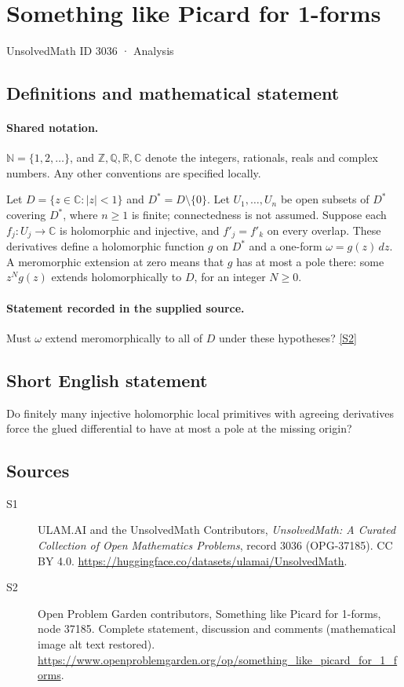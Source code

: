 \documentclass[11pt]{book}
\newcommand{\sref}[2]{\hyperlink{source:#1:#2}{[S#2]}}
\begin{document}
\setcounter{section}{3035}
\section{Something like Picard for 1-forms}\label{3036}
{\small\sffamily UnsolvedMath ID 3036 · Analysis}
\subsection{Definitions and mathematical statement}

\paragraph{Shared notation.}$\mathbb N=\{1,2,\ldots\}$, and $\mathbb Z,\mathbb Q,\mathbb R,\mathbb C$ denote the integers, rationals, reals and complex numbers. Any other conventions are specified locally.


Let $D=\{z\in\mathbb C:|z|<1\}$ and $D^*=D\setminus\{0\}$. Let $U_1,\ldots,U_n$ be open subsets of $D^*$ covering $D^*$, where $n\geq1$ is finite; connectedness is not assumed. Suppose each $f_j:U_j\to\mathbb C$ is holomorphic and injective, and $f'_j=f'_k$ on every overlap. These derivatives define a holomorphic function $g$ on $D^*$ and a one-form $\omega=g(z)\,dz$. A meromorphic extension at zero means that $g$ has at most a pole there: some $z^N g(z)$ extends holomorphically to $D$, for an integer $N\geq0$.
\paragraph{Statement recorded in the supplied source.}
Must $\omega$ extend meromorphically to all of $D$ under these hypotheses? \sref{3036}{2}
\subsection{Short English statement}
Do finitely many injective holomorphic local primitives with agreeing derivatives force the glued differential to have at most a pole at the missing origin?
\subsection{Sources}
\begin{description}
\item[\hypertarget{source:3036:1}{S1}] ULAM.AI and the UnsolvedMath Contributors, \emph{UnsolvedMath: A Curated Collection of Open Mathematics Problems}, record 3036 (OPG-37185). CC BY 4.0. \url{https://huggingface.co/datasets/ulamai/UnsolvedMath}.
\item[\hypertarget{source:3036:2}{S2}] Open Problem Garden contributors, Something like Picard for 1-forms, node 37185. Complete statement, discussion and comments (mathematical image alt text restored). \url{https://www.openproblemgarden.org/op/something_like_picard_for_1_forms}.
\end{description}
\label{end:3036}
\end{document}
